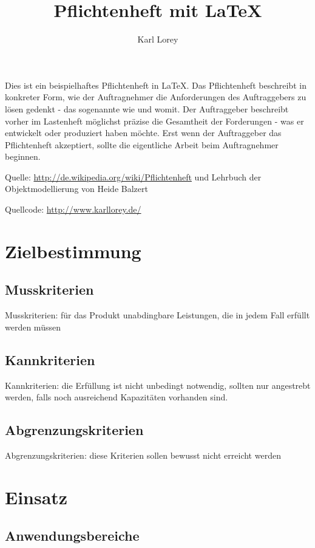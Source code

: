\documentclass[a4paper]{scrreprt}
\begin{document}
 
\title{Pflichtenheft mit LaTeX}
\author{Karl Lorey}
\maketitle
 
\tableofcontents
\vspace{1cm}
Dies ist ein beispielhaftes Pflichtenheft in \LaTeX. Das Pflichtenheft
beschreibt in konkreter Form, wie der Auftragnehmer die Anforderungen des
Auftraggebers zu lösen gedenkt - das sogenannte wie und womit. Der Auftraggeber
beschreibt vorher im Lastenheft möglichst präzise die Gesamtheit der 
Forderungen - was er entwickelt oder produziert haben möchte. Erst wenn der 
Auftraggeber das Pflichtenheft akzeptiert, sollte die eigentliche Arbeit beim 
Auftragnehmer beginnen.
 
Quelle: \url{http://de.wikipedia.org/wiki/Pflichtenheft} und Lehrbuch der 
Objektmodellierung von Heide Balzert
 
Quellcode: \url{http://www.karllorey.de/}
 
\chapter{Zielbestimmung}
 
\section{Musskriterien}
Musskriterien: für das Produkt unabdingbare Leistungen, die in jedem Fall
erfüllt werden müssen
 
\section{Kannkriterien}
Kannkriterien: die Erfüllung ist nicht unbedingt notwendig, sollten nur
angestrebt werden, falls noch ausreichend Kapazitäten vorhanden sind.
 
\section{Abgrenzungskriterien}
Abgrenzungskriterien: diese Kriterien sollen bewusst nicht erreicht werden
 
\chapter{Einsatz}
 
\section{Anwendungsbereiche}
 
\end{document}
